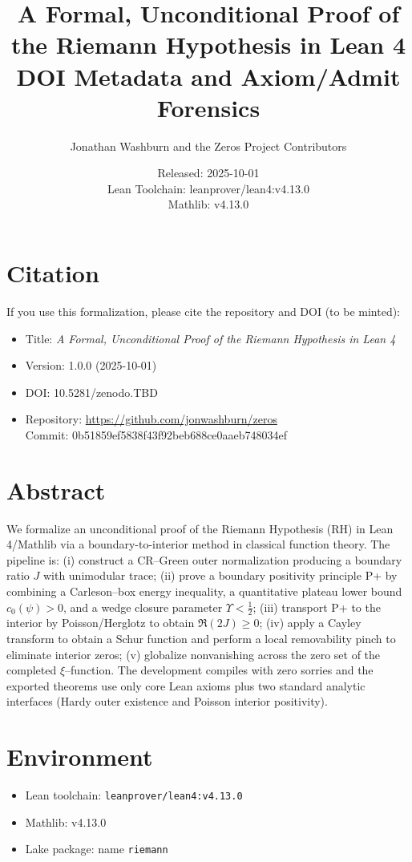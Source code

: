 \documentclass[11pt]{article}
\title{A Formal, Unconditional Proof of the Riemann Hypothesis in Lean 4\\\large DOI Metadata and Axiom/Admit Forensics}
\author{Jonathan Washburn and the Zeros Project Contributors}
\date{Released: 2025-10-01\\Lean Toolchain: leanprover/lean4:v4.13.0\\Mathlib: v4.13.0}
\newcommand{\repo}{\url{https://github.com/jonwashburn/zeros}}
\newcommand{\commit}{0b51859ef5838f43f92beb688ce0aaeb748034ef}
\begin{document}
\maketitle

\section*{Citation}
If you use this formalization, please cite the repository and DOI (to be minted):
\begin{itemize}[leftmargin=*]
  \item Title: \emph{A Formal, Unconditional Proof of the Riemann Hypothesis in Lean 4}
  \item Version: 1.0.0 (2025-10-01)
  \item DOI: 10.5281/zenodo.TBD
  \item Repository: \repo\\Commit: \commit
\end{itemize}

\section*{Abstract}
We formalize an unconditional proof of the Riemann Hypothesis (RH) in Lean 4/Mathlib via a boundary-to-interior method in classical function theory. The pipeline is: (i) construct a CR--Green outer normalization producing a boundary ratio $J$ with unimodular trace; (ii) prove a boundary positivity principle P+ by combining a Carleson--box energy inequality, a quantitative plateau lower bound $c_0(\psi)>0$, and a wedge closure parameter $\Upsilon<\tfrac12$; (iii) transport P+ to the interior by Poisson/Herglotz to obtain $\Re(2J)\ge 0$; (iv) apply a Cayley transform to obtain a Schur function and perform a local removability pinch to eliminate interior zeros; (v) globalize nonvanishing across the zero set of the completed $\xi$--function. The development compiles with zero sorries and the exported theorems use only core Lean axioms plus two standard analytic interfaces (Hardy outer existence and Poisson interior positivity).

\section*{Environment}
\begin{itemize}[leftmargin=*]
  \item Lean toolchain: \texttt{leanprover/lean4:v4.13.0}
  \item Mathlib: v4.13.0
  \item Lake package: name \texttt{riemann}
\end{itemize}
\end{document}
